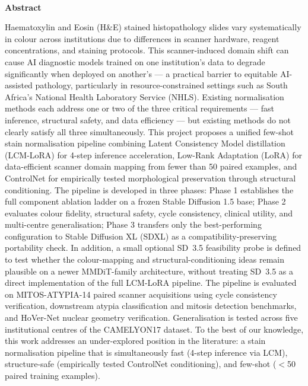 \documentclass[a4paper,twoside,12pt]{report}
\renewenvironment{abstract}{\ \vfill\begin{center}\textbf{Abstract}\end{center}\addcontentsline{toc}{section}{Abstract}}{\vfill\vfill\newpage}
\begin{document}
\begin{abstract}
Haematoxylin and Eosin (H\&E) stained histopathology slides vary systematically in colour across institutions due to differences in scanner hardware, reagent concentrations, and staining protocols. This scanner-induced domain shift can cause AI diagnostic models trained on one institution's data to degrade significantly when deployed on another's --- a practical barrier to equitable AI-assisted pathology, particularly in resource-constrained settings such as South Africa's National Health Laboratory Service (NHLS). Existing normalisation methods each address one or two of the three critical requirements --- fast inference, structural safety, and data efficiency --- but existing methods do not clearly satisfy all three simultaneously. This project proposes a unified few-shot stain normalisation pipeline combining Latent Consistency Model distillation (LCM-LoRA) for 4-step inference acceleration, Low-Rank Adaptation (LoRA) for data-efficient scanner domain mapping from fewer than 50 paired examples, and ControlNet for empirically tested morphological preservation through structural conditioning. The pipeline is developed in three phases: Phase 1 establishes the full component ablation ladder on a frozen Stable Diffusion 1.5 base; Phase 2 evaluates colour fidelity, structural safety, cycle consistency, clinical utility, and multi-centre generalisation; Phase 3 transfers only the best-performing configuration to Stable Diffusion XL (SDXL) as a compatibility-preserving portability check. In addition, a small optional SD~3.5 feasibility probe is defined to test whether the colour-mapping and structural-conditioning ideas remain plausible on a newer MMDiT-family architecture, without treating SD~3.5 as a direct implementation of the full LCM-LoRA pipeline. The pipeline is evaluated on MITOS-ATYPIA-14 paired scanner acquisitions using cycle consistency verification, downstream atypia classification and mitosis detection benchmarks, and HoVer-Net nuclear geometry verification. Generalisation is tested across five institutional centres of the CAMELYON17 dataset. To the best of our knowledge, this work addresses an under-explored position in the literature: a stain normalisation pipeline that is simultaneously fast (4-step inference via LCM), structure-safe (empirically tested ControlNet conditioning), and few-shot ($<$50 paired training examples).
\end{abstract}
\end{document}
